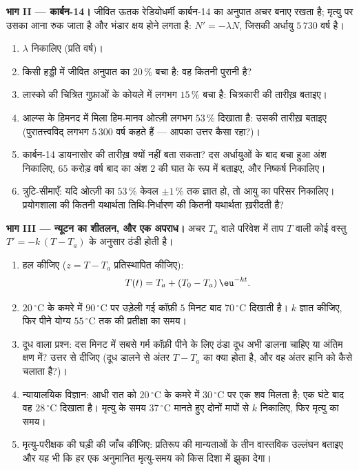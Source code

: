 \begin{problem}
\medskip
\noindent\textbf{भाग II --- कार्बन-14।}
जीवित ऊतक रेडियोधर्मी कार्बन-14 का अनुपात अचर बनाए रखता है; मृत्यु पर उसका
आना रुक जाता है और भंडार क्षय होने लगता है: $N' = -\lambda N$, जिसकी अर्धायु $5\,730$ वर्ष
है।
\begin{enumerate}[resume]
  \item $\lambda$ निकालिए (प्रति वर्ष)।
  \item किसी हड्डी में जीवित अनुपात का $20\,\%$ बचा है: वह कितनी पुरानी है?
  \item लास्को की चित्रित गुफ़ाओं के कोयले में लगभग $15\,\%$ बचा है: चित्रकारी
        की तारीख़ बताइए।
  \item आल्प्स के हिमनद में मिला हिम-मानव ओत्ज़ी लगभग $53\,\%$ दिखाता है: उसकी
        तारीख़ बताइए (पुरातत्त्वविद् लगभग $5\,300$ वर्ष कहते हैं --- आपका उत्तर
        कैसा रहा?)।
  \item कार्बन-14 डायनासोर की तारीख़ क्यों नहीं बता सकता? दस अर्धायुओं के
        बाद बचा हुआ अंश निकालिए, $65$ करोड़ वर्ष बाद का अंश $2$ की घात के
        रूप में बताइए, और निष्कर्ष निकालिए।
  \item त्रुटि-सीमाएँ: यदि ओत्ज़ी का $53\,\%$ केवल $\pm 1\,\%$ तक ज्ञात हो, तो आयु का
        परिसर निकालिए। प्रयोगशाला की कितनी यथार्थता तिथि-निर्धारण की कितनी
        यथार्थता ख़रीदती है?
\end{enumerate}

\medskip
\noindent\textbf{भाग III --- न्यूटन का शीतलन, और एक अपराध।}
अचर $T_a$ वाले परिवेश में ताप $T$ वाली कोई वस्तु $T' = -k\,(T - T_a)$ के अनुसार ठंडी होती
है।
\begin{enumerate}[resume]
  \item {} हल कीजिए ($z = T - T_a$ प्रतिस्थापित कीजिए):
        \[
        T(t) = T_a + (T_0 - T_a)\,\eu^{-kt} .
        \]
  \item $20\,^\circ$C के कमरे में $90\,^\circ$C पर उड़ेली गई कॉफ़ी $5$ मिनट बाद $70\,^\circ$C
        दिखाती है। $k$ ज्ञात कीजिए, फिर पीने योग्य $55\,^\circ$C तक की प्रतीक्षा
        का समय।
  \item दूध वाला प्रश्न: दस मिनट में सबसे गर्म कॉफ़ी पीने के लिए ठंडा दूध
        अभी डालना चाहिए या अंतिम क्षण में? उत्तर  से दीजिए (दूध डालने
        से अंतर $T - T_a$ का क्या होता है, और वह अंतर हानि को कैसे चलाता है?)।
  \item न्यायालयिक विज्ञान: आधी रात को $20\,^\circ$C के कमरे में $30\,^\circ$C पर एक शव
        मिलता है; एक घंटे बाद वह $28\,^\circ$C दिखाता है। मृत्यु के समय $37\,^\circ$C
        मानते हुए दोनों मापों से $k$ निकालिए, फिर मृत्यु का समय।
  \item मृत्यु-परीक्षक की घड़ी की जाँच कीजिए: प्रतिरूप की मान्यताओं के तीन
        वास्तविक उल्लंघन बताइए और यह भी कि हर एक अनुमानित मृत्यु-समय को किस
        दिशा में झुका देगा।
\end{enumerate}


\end{problem}

